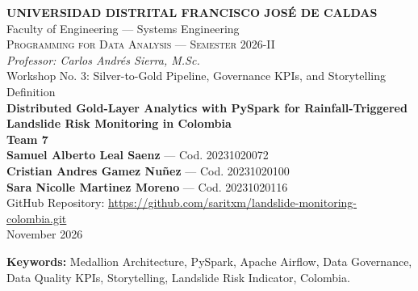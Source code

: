 \documentclass[11pt,a4paper]{article}
\begin{document}
\thispagestyle{empty}
\begin{center}
{\large\bfseries UNIVERSIDAD DISTRITAL FRANCISCO JOSÉ DE CALDAS}\\
Faculty of Engineering --- Systems Engineering\\[0.4em]
\textsc{Programming for Data Analysis --- Semester 2026-II}\\
\textit{Professor: Carlos Andrés Sierra, M.Sc.}\\[2em]
{\LARGE\color{udblue} Workshop No. 3: Silver-to-Gold Pipeline, Governance KPIs, and Storytelling Definition}\\[1em]
{\large\bfseries Distributed Gold-Layer Analytics with PySpark for Rainfall-Triggered Landslide Risk Monitoring in Colombia}\\[1.2em]
{\bfseries Team 7}\\[1em]
\textbf{Samuel Alberto Leal Saenz} --- Cod. 20231020072\\
\textbf{Cristian Andres Gamez Nuñez} --- Cod. 20231020100\\
\textbf{Sara Nicolle Martinez Moreno} --- Cod. 20231020116\\[0.6em]
{\small GitHub Repository: \url{https://github.com/saritxm/landslide-monitoring-colombia.git}}\\[1em]
November 2026
\end{center}
\vspace{1em}
\begin{abstract}
This report documents the third phase of the landslide risk monitoring platform for Colombia. Building on the Bronze
ingestion and FileSensor-triggered Silver layers delivered in Workshop \#2, we (i) revise both pipelines using the
evidence produced by real runs in development and in the Docker Compose stack, and (ii) implement the Gold layer of the
Medallion Architecture. A scheduled Airflow DAG runs PySpark in local mode, reads each Silver topic folder as a single
distributed DataFrame and persists two Parquet summaries: a governance dataset with 138 data-quality KPI records
and a storytelling dataset with 1,789 analytical records organized in 13 dashboard-ready sections. Twelve
data-quality findings, measured over 9 Silver files, justify every governance KPI. The storytelling layer
operationalizes the Landslide Risk Indicator (LRI) defined in Workshop \#1 for ten Andean monitoring points, contrasts
current rainfall with a ten-year ERA5 baseline, and links each point to its documented landslide history and to the
vocabulary of the NASA catalog narratives. In the latest run, 1 point is classified MEDIUM
and 9 LOW; the highest score corresponds to Pasto (0.51), where five-day
rainfall reaches 99%
\end{abstract}
\noindent\textbf{Keywords:} Medallion Architecture, PySpark, Apache Airflow, Data Governance, Data Quality KPIs,
Storytelling, Landslide Risk Indicator, Colombia.
\newpage
\tableofcontents
\newpage
\end{document}
